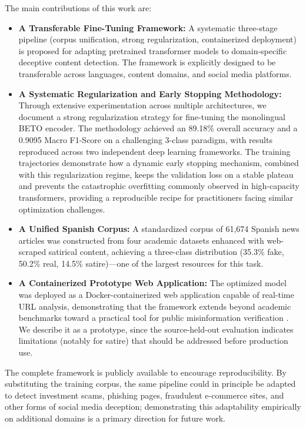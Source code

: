 \documentclass[informatics,article,submit,pdftex,moreauthors]{Definitions/mdpi}
\begin{document}
The main contributions of this work are:
\begin{itemize}
    \item \textbf{A Transferable Fine-Tuning Framework:} A systematic three-stage pipeline (corpus unification, strong regularization, containerized deployment) is proposed for adapting pretrained transformer models to domain-specific deceptive content detection. The framework is explicitly designed to be transferable across languages, content domains, and social media platforms.
    \item \textbf{A Systematic Regularization and Early Stopping Methodology:} Through extensive experimentation across multiple architectures, we document a strong regularization strategy for fine-tuning the monolingual BETO encoder. The methodology achieved an 89.18\% overall accuracy and a 0.9095 Macro F1-Score on a challenging 3-class paradigm, with results reproduced across two independent deep learning frameworks. The training trajectories demonstrate how a dynamic early stopping mechanism, combined with this regularization regime, keeps the validation loss on a stable plateau and prevents the catastrophic overfitting commonly observed in high-capacity transformers, providing a reproducible recipe for practitioners facing similar optimization challenges.
    \item \textbf{A Unified Spanish Corpus:} A standardized corpus of 61,674 Spanish news articles was constructed from four academic datasets \citep{posadas2019detection, acosta2019construccion, tretiakov2022detection, blanco2024enhancing} enhanced with web-scraped satirical content, achieving a three-class distribution (35.3\% fake, 50.2\% real, 14.5\% satire)—one of the largest resources for this task.
    \item \textbf{A Containerized Prototype Web Application:} The optimized model was deployed as a Docker-containerized web application capable of real-time URL analysis, demonstrating that the framework extends beyond academic benchmarks toward a practical tool for public misinformation verification \citep{ali2022fake}. We describe it as a prototype, since the source-held-out evaluation indicates limitations (notably for satire) that should be addressed before production use.
\end{itemize}

The complete framework is publicly available to encourage reproducibility. By substituting the training corpus, the same pipeline could in principle be adapted to detect investment scams, phishing pages, fraudulent e-commerce sites, and other forms of social media deception; demonstrating this adaptability empirically on additional domains is a primary direction for future work.
\end{document}
